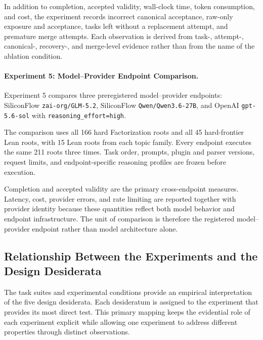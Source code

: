 \documentclass{article}
\theoremstyle{plain}
\begin{document}
In addition to completion, accepted validity, wall-clock time, token
consumption, and cost, the experiment records incorrect canonical
acceptance, raw-only exposure and acceptance, tasks left without a
replacement attempt, and premature merge attempts. Each observation is
derived from task-, attempt-, canonical-, recovery-, and merge-level
evidence rather than from the name of the ablation condition.


\paragraph{Experiment 5: Model--Provider Endpoint Comparison.}

Experiment 5 compares three preregistered model--provider endpoints:
SiliconFlow \texttt{zai-org/GLM-5.2}, SiliconFlow
\texttt{Qwen/Qwen3.6-27B}, and OpenAI \texttt{gpt-5.6-sol} with
\texttt{reasoning\_effort=high}.

The comparison uses all 166 hard Factorization roots and all
45 hard-frontier Lean roots, with 15 Lean roots from each topic family.
Every endpoint executes the same 211 roots three times. Task order,
prompts, plugin and parser versions, request limits, and endpoint-specific
reasoning profiles are frozen before execution.

Completion and accepted validity are the primary cross-endpoint measures.
Latency, cost, provider errors, and rate limiting are reported together
with provider identity because these quantities reflect both model
behavior and endpoint infrastructure. The unit of comparison is therefore
the registered model--provider endpoint rather than model architecture
alone.


\subsection{Relationship Between the Experiments and the Design Desiderata}

The task suites and experimental conditions provide an empirical
interpretation of the five design desiderata. Each desideratum is assigned
to the experiment that provides its most direct test. This primary mapping
keeps the evidential role of each experiment explicit while allowing one
experiment to address different properties through distinct observations.
\end{document}

